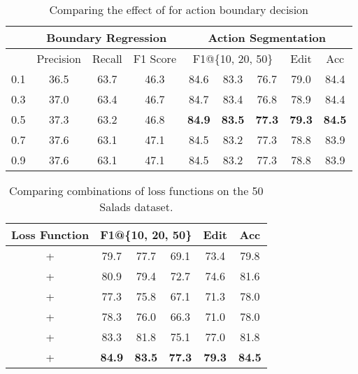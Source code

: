 \documentclass[10pt,twocolumn,letterpaper]{article}
\begin{document}
\begin{table*}[t!]
\small
\centering
\begin{tabular}{cccc|ccccc}
\hline
          & \multicolumn{3}{c}{Boundary Regression} & \multicolumn{5}{c}{Action Segmentation}                           \\ \hline
 & Precision     & Recall    & F1 Score    & \multicolumn{3}{c}{F1@\{10, 20, 50\}} & Edit     & Acc            \\ \hline
0.1        & 36.5      & 63.7    & 46.3       & 84.6          & 83.3          & 76.7          & 79.0          & 84.4             \\
0.3        & 37.0      & 63.4    & 46.7       & 84.7          & 83.4          & 76.8          & 78.9          & 84.4                  \\
0.5        & 37.3      & 63.2    & 46.8       & \textbf{84.9} & \textbf{83.5} & \textbf{77.3} & \textbf{79.3} & \textbf{84.5}  \\
0.7        & 37.6      & 63.1    & 47.1       & 84.5          & 83.2          & 77.3          & 78.8          & 83.9                  \\
0.9        & 37.6      & 63.1    & 47.1       & 84.5          & 83.2          & 77.3          & 78.8          & 83.9                  \\ \hline
\end{tabular}
\caption{Comparing the effect of  for action boundary decision}
\label{tab:threshold}
\vspace{-5pt}
\end{table*}


\begin{table}[t!]
\small
\centering
\begin{tabular}{c|ccccc}
\hline
Loss Function &  \multicolumn{3}{c}{F1@\{10, 20, 50\}} & Edit & Acc \\ \hline
 +               & 79.7          & 77.7          & 69.1          & 73.4          & 79.8 \\
 +            & 80.9          & 79.4          & 72.7          & 74.6          & 81.6 \\
 +               & 77.3          & 75.8          & 67.1          & 71.3          & 78.0\\
 +            & 78.3          & 76.0          & 66.3          & 71.0          & 78.0\\
 +     & 83.3          & 81.8          & 75.1          & 77.0          & 81.8\\
 +  & \textbf{84.9} & \textbf{83.5} & \textbf{77.3} & \textbf{79.3} & \textbf{84.5}   \\ \hline
\end{tabular}
\caption{Comparing combinations of loss functions on the 50 Salads dataset.}
\label{tab:loss}
\end{table}
\end{document}
